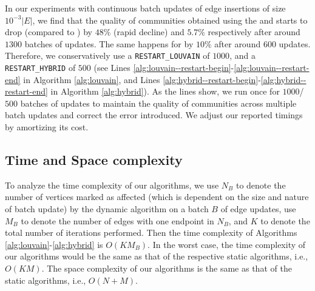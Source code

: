 In our experiments with continuous batch updates of edge insertions of size $10^{-3} |E|$, we find that the quality of communities obtained using the \DelLou{} and \FroLou{} starts to drop (compared to \StaLou{}) by $48\%$ (rapid decline) and $5.7\%$ respectively after around $1300$ batches of updates. The same happens for \FroHyb{} by $10\%$ after around $600$ updates. Therefore, we conservatively use a \verb|RESTART_LOUVAIN| of $1000$, and a \verb|RESTART_HYBRID| of $500$ (see Lines \ref{alg:louvain--restart-begin}-\ref{alg:louvain--restart-end} in Algorithm \ref{alg:louvain}, and Lines \ref{alg:hybrid--restart-begin}-\ref{alg:hybrid--restart-end} in Algorithm \ref{alg:hybrid}). As the lines show, we run \StaLou{} once for $1000$/$500$ batches of updates to maintain the quality of communities across multiple batch updates and correct the error introduced. We adjust our reported timings by amortizing its cost.




\subsection{Time and Space complexity}
\label{sec:complexity}

To analyze the time complexity of our algorithms, we use $N_B$ to denote the number of vertices marked as affected (which is dependent on the size and nature of batch update) by the dynamic algorithm on a batch $B$ of edge updates, use $M_B$ to denote the number of edges with one endpoint in $N_B$, and $K$ to denote the total number of iterations performed. Then the time complexity of Algorithms \ref{alg:louvain}-\ref{alg:hybrid} is $O(K M_B)$. In the worst case, the time complexity of our algorithms would be the same as that of the respective static algorithms, i.e., $O(KM)$. The space complexity of our algorithms is the same as that of the static algorithms, i.e., $O(N + M)$.
